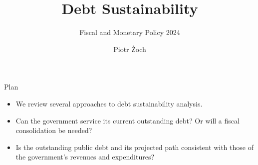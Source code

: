 \documentclass[11pt,xcolor={dvipsnames},aspectratio=159,hyperref={pdftex,pdfpagemode=UseNone,hidelinks,pdfdisplaydoctitle=true},usepdftitle=false]{beamer}
\begin{document}
\title{Debt Sustainability}
\subtitle{Fiscal and Monetary Policy 2024}

\author{Piotr Żoch}%
\frame{\titlepage}

\begin{frame}{Plan}
    \begin{itemize}
    \item We review several approaches to debt sustainability analysis.
    \item Can the government service its current outstanding debt? Or will a fiscal consolidation be needed?
    \item Is the outstanding public debt and its projected path consistent with those of the government's revenues and expenditures?
   
    \end{itemize}
\end{frame}


\begin{frame}
\end{frame}
\end{document}
